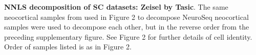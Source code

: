 \textbf{NNLS decomposition of SC datasets: Zeisel by Tasic}. The same neocortical samples from \citep{Tasic_2018,Zeisel_2018} used in Figure 2 to decompose NeuroSeq neocortical samples were used to decompose each other, but in the reverse order from the preceding supplementary figure. See Figure 2 for further details of cell identity. Order of samples listed is as in Figure 2. 
